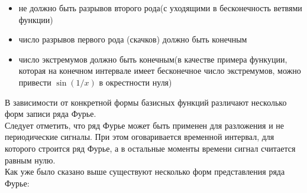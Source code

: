 \begin{itemize}
\item не должно быть разрывов второго рода(с уходящими в бесконечность ветвями функции)
\item число разрывов первого рода (скачков) должно быть конечным
\item число экстремумов должно быть конечным(в качестве примера функуции, которая
на конечном интервале имеет бесконечное число экстремумов, можно привести $\sin(1/x)$ в окрестности нуля)
\end{itemize}
\noindent В зависимости от конкретной формы базисных функций различают несколько форм записи ряда Фурье. \\
Следует отметить, что ряд Фурье может быть применен для разложения и не периодические сигналы. При этом оговаривается временной интервал, для которого строится ряд Фурье, а 
в остальные моменты времени сигнал считается равным нулю. \\
\noindent Как уже было сказано выше существуют несколько форм представления ряда Фурье:

